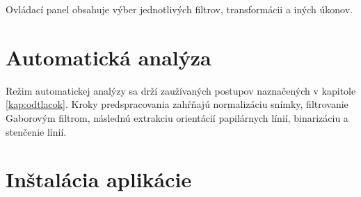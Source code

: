   Ovládací panel obsahuje výber jednotlivých filtrov, transformácii a iných úkonov. %

  \section{Automatická analýza}
  Režim automatickej analýzy sa drží zaužívaných postupov naznačených v kapitole \ref{kap:odtlacok}. Kroky predspracovania zahŕňajú 
  normalizáciu snímky, filtrovanie Gaborovým filtrom, následnú extrakciu orientácií papilárnych línií, binarizáciu a stenčenie línií.
  
  \section{Inštalácia aplikácie} \label{sec:instalacia}


